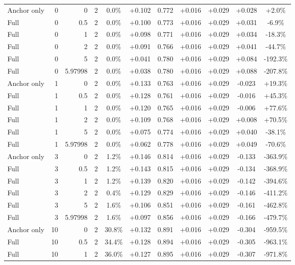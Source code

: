 \begin{table}[htbp]
\begin{tabular}{lrrrccccccc}
Anchor only & 0 & 0 & 2 & 0.0\% & +0.102 & 0.772 & +0.016 & +0.029 & +0.028 & +2.0\% \\
Full & 0 & 0.5 & 2 & 0.0\% & +0.100 & 0.773 & +0.016 & +0.029 & +0.031 & -6.9\% \\
Full & 0 & 1 & 2 & 0.0\% & +0.098 & 0.771 & +0.016 & +0.029 & +0.034 & -18.3\% \\
Full & 0 & 2 & 2 & 0.0\% & +0.091 & 0.766 & +0.016 & +0.029 & +0.041 & -44.7\% \\
Full & 0 & 5 & 2 & 0.0\% & +0.041 & 0.780 & +0.016 & +0.029 & +0.084 & -192.3\% \\
Full & 0 & 5.97998 & 2 & 0.0\% & +0.038 & 0.780 & +0.016 & +0.029 & +0.088 & -207.8\% \\
Anchor only & 1 & 0 & 2 & 0.0\% & +0.133 & 0.763 & +0.016 & +0.029 & -0.023 & +19.3\% \\
Full & 1 & 0.5 & 2 & 0.0\% & +0.128 & 0.761 & +0.016 & +0.029 & -0.016 & +45.3\% \\
Full & 1 & 1 & 2 & 0.0\% & +0.120 & 0.765 & +0.016 & +0.029 & -0.006 & +77.6\% \\
Full & 1 & 2 & 2 & 0.0\% & +0.109 & 0.768 & +0.016 & +0.029 & +0.008 & +70.5\% \\
Full & 1 & 5 & 2 & 0.0\% & +0.075 & 0.774 & +0.016 & +0.029 & +0.040 & -38.1\% \\
Full & 1 & 5.97998 & 2 & 0.0\% & +0.062 & 0.778 & +0.016 & +0.029 & +0.049 & -70.6\% \\
Anchor only & 3 & 0 & 2 & 1.2\% & +0.146 & 0.814 & +0.016 & +0.029 & -0.133 & -363.9\% \\
Full & 3 & 0.5 & 2 & 1.2\% & +0.143 & 0.815 & +0.016 & +0.029 & -0.134 & -368.9\% \\
Full & 3 & 1 & 2 & 1.2\% & +0.139 & 0.820 & +0.016 & +0.029 & -0.142 & -394.6\% \\
Full & 3 & 2 & 2 & 0.4\% & +0.129 & 0.829 & +0.016 & +0.029 & -0.146 & -411.2\% \\
Full & 3 & 5 & 2 & 1.6\% & +0.106 & 0.851 & +0.016 & +0.029 & -0.161 & -462.8\% \\
Full & 3 & 5.97998 & 2 & 1.6\% & +0.097 & 0.856 & +0.016 & +0.029 & -0.166 & -479.7\% \\
Anchor only & 10 & 0 & 2 & 30.8\% & +0.132 & 0.891 & +0.016 & +0.029 & -0.304 & -959.5\% \\
Full & 10 & 0.5 & 2 & 34.4\% & +0.128 & 0.894 & +0.016 & +0.029 & -0.305 & -963.1\% \\
Full & 10 & 1 & 2 & 36.0\% & +0.127 & 0.895 & +0.016 & +0.029 & -0.307 & -971.8\% \\

\end{tabular}
\end{table}
